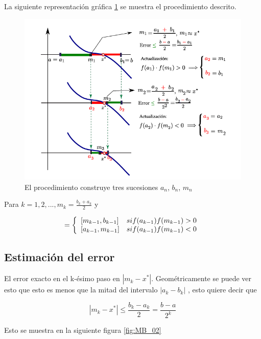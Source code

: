 \documentclass[12pt,a4paper]{article}
\begin{document}
La siguiente representación gráfica \ref{fig:MB_01} se muestra el procedimiento descrito. 

\newpage

\begin{figure}[h]
\centering
\includegraphics[scale=0.8]{MB_01}
\caption{El procedimiento construye tres sucesiones $a_{n}$, $b_{n}$, $m_{n}$}
\label{fig:MB_01}
\end{figure}

Para $k = 1, 2, ..., m_{k}=\frac{b_{k}+ a_{k}}{2}$ y  

\begin{equation}
[a_{k},b_{k}] = \left\lbrace
\begin{array}{ll}
\textup{} [m_{k-1}, b_{k-1}] &si f(a_{k-1})f(m_{k-1})>0 \\
\textup{} [a_{k-1}, m_{k-1}] &si f(a_{k-1})f(m_{k-1})<0
\end{array}
\right.
\end{equation}


\subsection{Estimación del error}
El error exacto en el k-ésimo paso en $|m_{k} - x^{*}|$.
Geométricamente se puede ver esto que esto es menos que la mitad del intervalo $|a_{k} - b_{k}|$ , esto quiere decir que


\begin{equation}
    |m_{k} - x^{*}| \leq \frac{b_{k}-a_{k}}{2}= \frac{b-a}{2^{k}}
\end{equation}

Esto se muestra en la siguiente figura \ref{fig:MB_02}
\end{document}
